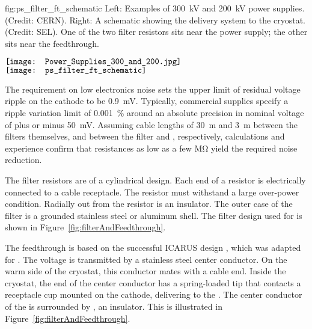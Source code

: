 \begin{dunefigure}  
{fig:ps_filter_ft_schematic}
{Left: Examples of \SI{300}{kV} and \SI{200}{kV} power supplies. %
 (Credit: CERN). Right:  A schematic showing the  delivery system to the cryostat. (Credit:  SEL).  
One of the two filter resistors sits near the power supply; the other sits near the feedthrough.}
\begin{minipage}{\textwidth}%
  \centering
 $\vcenter{\hbox{\texttt{[image: Power\_Supplies\_300\_and\_200.jpg]}}}$
 \hspace*{0.02\textwidth}  $\vcenter{\hbox{\texttt{[image: ps\_filter\_ft\_schematic]}}}$
\end{minipage}
\end{dunefigure}
The requirement  
on low electronics noise sets the upper limit of residual voltage ripple on the cathode to be \SI{0.9}{mV}. 
Typically, commercial supplies specify a ripple variation limit of 
\SI{.001}{\%} around an absolute precision in nominal voltage of plus or minus \SI{50}{mV}.
%
Assuming cable lengths of \SI{30}{m} and \SI{3}{m} between the filters themselves, and between the filter and \fdth, respectively, calculations and experience confirm that resistances as low as a few \si{\mega\ohm} yield the required noise reduction. 

The %
filter resistors are of a cylindrical design. 
Each end of a  resistor is electrically connected to a cable receptacle. 
The resistor %
must withstand a large over-power condition.  Radially out from the resistor is an insulator. %
The outer case of the filter is a grounded stainless steel or aluminum shell. The filter design used for  is shown in Figure~\ref{fig:filterAndFeedthrough}.

The  feedthrough %
is based on the successful ICARUS design \cite{ICARUS-t600}, %
which was adapted for .  The voltage is transmitted by a stainless steel center conductor.  On the warm side of the cryostat, this conductor mates with a cable end.  Inside the cryostat, the end of the center conductor has a spring-loaded tip that %
contacts a receptacle cup mounted on the cathode, delivering  to the .  The center conductor of the \fdth is surrounded by , an insulator. This is illustrated in Figure~\ref{fig:filterAndFeedthrough}.

